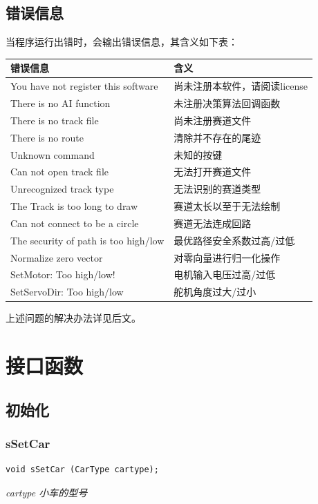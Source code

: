 \documentclass[titlepage,a4paper]{ctexart}
\begin{document}
\subsection{错误信息}
当程序运行出错时，会输出错误信息，其含义如下表：
\begin{center}
\begin{tabular}{ll}
\hline
错误信息 & 含义 \\
\hline
You have not register this software & 尚未注册本软件，请阅读license \\
There is no AI function	& 未注册决策算法回调函数 \\
There is no track file  & 尚未注册赛道文件 \\
There is no route	& 清除并不存在的尾迹 \\
Unknown command	& 未知的按键 \\
Can not open track file	& 无法打开赛道文件 \\
Unrecognized track type & 无法识别的赛道类型 \\
The Track is too long to draw	& 赛道太长以至于无法绘制 \\
Can not connect to be a circle	& 赛道无法连成回路 \\
The security of path is too high/low	& 最优路径安全系数过高/过低 \\
Normalize zero vector	& 对零向量进行归一化操作 \\
SetMotor: Too high/low!	& 电机输入电压过高/过低 \\
SetServoDir: Too high/low & 舵机角度过大/过小 \\
\hline
\end{tabular}
\end{center}

上述问题的解决办法详见后文。
\newpage
\section{接口函数}

\subsection{初始化}
\subsubsection{sSetCar}
\begin{lstlisting}[numbers=none]
void sSetCar (CarType cartype);
\end{lstlisting}
\par \emph{cartype 小车的型号}
\end{document}
